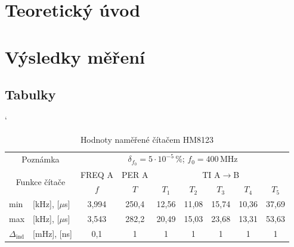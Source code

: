 \documentclass[a4paper, czech]{article}
\begin{document}
\section{Teoretický úvod}

\section{Výsledky měření}

\subsection{Tabulky}

\begin{table}[H]
    \catcode`
    \centering
    \caption{Hodnoty naměřené čítačem HM8123}
    \begin{tabular}{ll|ccccccc}
        \toprule
        \multicolumn{2}{c}{Poznámka}          & \multicolumn{7}{c}{$\delta_{f_0} = 5 \cdot 10^{-5}\,\%$;  $f_0 = 400\,\text{MHz}$}                                                                                                    \\
        \cmidrule(rl){1-9}
        \multicolumn{2}{c}{\multirow{3}{*}{Funkce čítače}}     & FREQ A             & PER A              & \multicolumn{5}{c}{TI A$\rightarrow$B}                                                                                  \\
        \cmidrule(rl){3-3}
        \cmidrule(rl){4-4}
        \cmidrule(rl){5-9}
        \multicolumn{2}{c}{\multirow{2}{*}{}} & \multirow{2}{*}{$f$} & \multirow{2}{*}{$T$} & \multirow{2}{*}{$T_1$} & \multirow{2}{*}{$T_2$} & \multirow{2}{*}{$T_3$} & \multirow{2}{*}{$T_4$} & \multirow{2}{*}{$T_5$} \\
        \multicolumn{2}{c}{}                  &                    &                    &                     &                     &                     &                     &                     \\
        \cmidrule(rl){1-9}
        min              & [kHz], [$\mu$s]            & 3,994              & 250,4              & 12,56               & 11,08               & 15,74               & 10,36               & 37,69               \\
        max              & [kHz], [$\mu$s]            & 3,543              & 282,2              & 20,49               & 15,03               & 23,68               & 13,31               & 53,63               \\
        $\Delta_\text{ind}$             & [mHz], [ns]            & 0,1                & 1                  & 1                   & 1                   & 1                   & 1                   & 1                   \\

\end{tabular}
\end{table}
\end{document}
